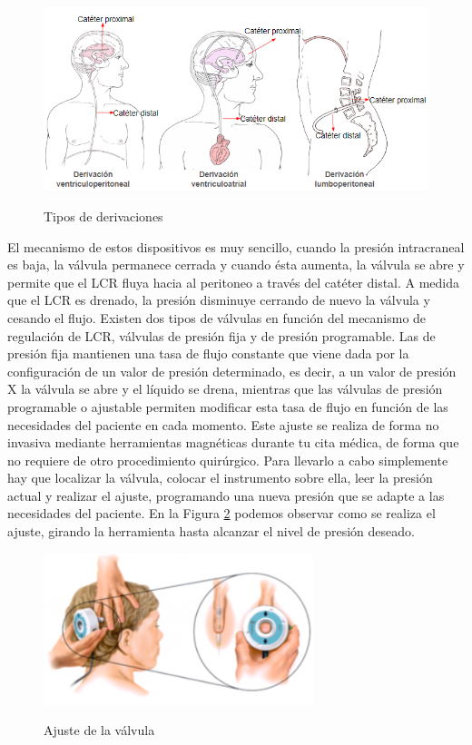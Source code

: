 \begin{figure}[h]
    \centering
    \includegraphics[width=1.2\textwidth]{img/derivaciones.PNG}
    \caption{Tipos de derivaciones}
    \cite{tipos_derivacion}
    \label{fig:derivaciones}
\end{figure}

El mecanismo de estos dispositivos es muy sencillo, cuando la presión intracraneal es baja, la válvula permanece cerrada y cuando ésta aumenta, la válvula se abre y permite que el LCR fluya hacia al peritoneo a través del catéter distal. A medida que el LCR es drenado, la presión disminuye cerrando de nuevo la válvula y cesando el flujo. Existen dos tipos de válvulas en función del mecanismo de regulación de LCR, válvulas de presión fija y de presión programable. Las de presión fija mantienen una tasa de flujo constante que viene dada por la configuración de un valor de presión determinado, es decir, a un valor de presión X la válvula se abre y el líquido se drena, mientras que las válvulas de presión programable o ajustable permiten modificar esta tasa de flujo en función de las necesidades del paciente en cada momento. Este ajuste se realiza de forma no invasiva mediante herramientas magnéticas durante tu cita médica, de forma que no requiere de otro procedimiento quirúrgico. Para llevarlo a cabo simplemente hay que localizar la válvula, colocar el instrumento sobre ella, leer la presión actual y realizar el ajuste, programando una nueva presión que se adapte a las necesidades del paciente.  En la Figura \ref{fig:ajuste_valvula} podemos observar como se realiza el ajuste, girando la herramienta hasta alcanzar el nivel de presión deseado.
\begin{figure}[h]
    \centering
    \includegraphics[width=0.7\textwidth]{img/ajuste_valvula.PNG}
    \caption{Ajuste de la válvula}
    \cite{herr_mag}
    \label{fig:ajuste_valvula}
\end{figure}


